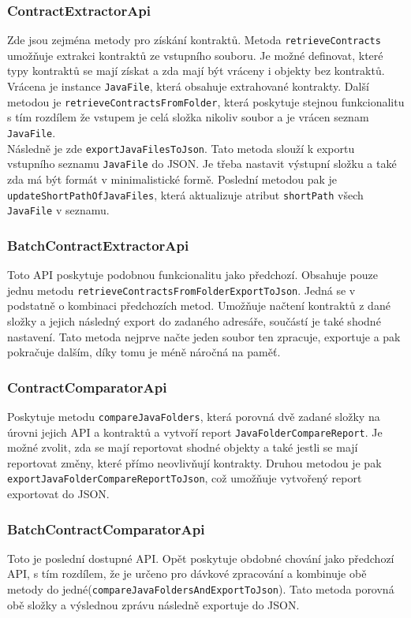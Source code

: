 			\subsubsection{ContractExtractorApi}
					Zde jsou zejména metody pro získání kontraktů. Metoda \texttt{retrieveContracts} umožňuje extrakci kontraktů ze vstupního souboru. Je možné definovat, které typy kontraktů se mají získat a zda mají být vráceny i objekty bez kontraktů. Vrácena je instance \texttt{JavaFile}, která obsahuje extrahované kontrakty. Další metodou je \texttt{retrieveContractsFromFolder}, která poskytuje stejnou funkcionalitu s tím rozdílem že vstupem je celá složka nikoliv soubor a je vrácen seznam \texttt{JavaFile}.\\
					
					Následně je zde \texttt{exportJavaFilesToJson}. Tato metoda slouží k exportu vstupního seznamu \texttt{JavaFile} do JSON. Je třeba nastavit výstupní složku a také zda má být formát v minimalistické formě. Poslední metodou pak je \texttt{updateShortPathOfJavaFiles}, která aktualizuje atribut \texttt{shortPath} všech \texttt{JavaFile} v seznamu.	    
			    
			\subsubsection{BatchContractExtractorApi}	
				Toto API poskytuje podobnou funkcionalitu jako předchozí. Obsahuje pouze jednu metodu \texttt{retrieveContractsFromFolderExportToJson}. Jedná se v podstatně o kombinaci předchozích metod. Umožňuje načtení kontraktů z dané složky a jejich následný export do zadaného adresáře, součástí je také shodné nastavení. Tato metoda nejprve načte jeden soubor ten zpracuje, exportuje a pak pokračuje dalším, díky tomu je méně náročná na paměť.
				
			\subsubsection{ContractComparatorApi}
				Poskytuje metodu \texttt{compareJavaFolders}, která porovná dvě zadané složky na úrovni jejich API a kontraktů a vytvoří report \texttt{JavaFolderCompareReport}. Je možné zvolit, zda se mají reportovat shodné objekty a také jestli se mají reportovat změny, které přímo neovlivňují kontrakty. Druhou metodou je pak \texttt{exportJavaFolderCompareReportToJson}, což umožňuje vytvořený report exportovat do JSON.
				
			\subsubsection{BatchContractComparatorApi}
				Toto je poslední dostupné API. Opět poskytuje obdobné chování jako předchozí API, s tím rozdílem, že je určeno pro dávkové zpracování a kombinuje obě metody do jedné(\texttt{compareJavaFoldersAndExportToJson}). Tato metoda porovná obě složky a výslednou zprávu následně exportuje do JSON.
				
